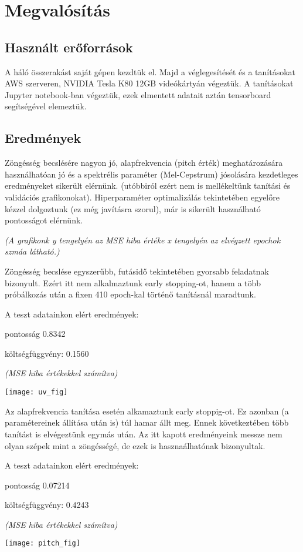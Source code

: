 \section{Megvalósítás}
\subsection{Használt erőforrások}
A háló összerakást saját gépen kezdtük el. Majd a véglegesítését és a tanításokat AWS szerveren, NVIDIA Tesla K80 12GB videókártyán végeztük. A tanításokat Jupyter notebook-ban végeztük, ezek elmentett adatait aztán tensorboard segítségével elemeztük.

\subsection{Eredmények}

Zöngésség becslésére nagyon jó, alapfrekvencia (pitch érték) meghatározására használhatóan jó és a spektrélis paraméter (Mel-Cepstrum) jósolására kezdetleges eredményeket sikerült elérnünk. (utóbbiról ezért nem is mellékeltünk tanítási és validációs grafikonokat). Hiperparaméter optimalizálás tekintetében egyelőre kézzel dolgoztunk (ez még javításra szorul), már is sikerült használható pontosságot  elérnünk.

\textit{(A grafikonk y tengelyén az MSE hiba értéke x tengelyén az elvégzett epochok szmáa látható.)}

\begin{minipage}{0.5\textwidth}
Zöngésség becslése egyszerűbb, futásidő tekintetében gyorsabb feladatnak bizonyult. Ezért itt nem alkalmaztunk early stopping-ot, hanem a több próbálkozás után a fixen 410 epoch-kal történő tanításnál maradtunk.

A teszt adatainkon elért eredmények:

pontosság 0.8342

költségfüggvény: 0.1560

\textit{(MSE hiba értékekkel számítva)}
\end{minipage}
\begin{minipage}{0.5\textwidth}
	\flushright	
	\texttt{[image: uv\_fig]}
\end{minipage}

Az alapfrekvencia tanítása esetén alkamaztunk early stoppig-ot. Ez azonban (a paramétereinek állítása után is) túl hamar állt meg. Ennek következtében több tanítást is elvégeztünk egymás után. Az itt kapott eredményeink messze nem olyan szépek mint a zöngésségé, de ezek is hasznaálhatónak bizonyultak.

A teszt adatainkon elért eredmények:

pontosság 0.07214

költségfüggvény: 0.4243

\textit{(MSE hiba értékekkel számítva)}

\texttt{[image: pitch\_fig]}